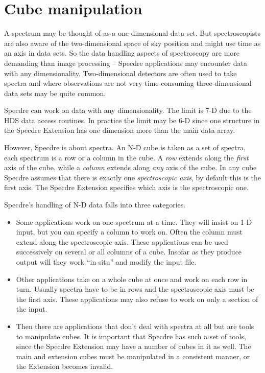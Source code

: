 \goodbreak
\section{Cube manipulation}
\label{cubeman}

A spectrum may be thought of as a one-dimensional data set.  But
spectroscopists are also aware of the two-dimensional space of sky
position and might use time as an axis in data sets.  So the data
handling aspects of spectroscopy are more demanding than image
processing -- Specdre applications may encounter data with any
dimensionality.  Two-dimensional detectors are often used to take
spectra and where observations are not very time-consuming
three-dimensional data sets may be quite common.

Specdre can work on data with any dimensionality.  The limit is 7-D due
to the HDS data access routines.  In practice the limit may be 6-D since
one structure in the Specdre Extension has one dimension more than the
main data array.

However, Specdre is about spectra.  An N-D cube is taken as a set of
spectra, each spectrum is a row or a column in the cube.  A {\it row}
extends along the {\it first} axis of the cube, while a {\it column}
extends along {\it any} axis of the cube.  In any cube Specdre assumes
that there is exactly one {\it spectroscopic axis}, by default this is
the first axis.  The Specdre Extension specifies which axis is the
spectroscopic one.

Specdre's handling of N-D data falls into three categories.

\begin{itemize}
\item Some applications work on one spectrum at a time.  They will
   insist on 1-D input, but you can specify a column to work on.  Often
   the column must extend along the spectroscopic axis.  These
   applications can be used successively on several or all columns of a
   cube.  Insofar as they produce output will they work ``in situ'' and
   modify the input file.

\item Other applications take on a whole cube at once and work on each
   row in turn.  Usually spectra have to be in rows and the
   spectroscopic axis must be the first axis.  These applications may
   also refuse to work on only a section of the input.

\item Then there are applications that don't deal with spectra at all
   but are tools to manipulate cubes.  It is important that Specdre has
   such a set of tools, since the Specdre Extension may have a number of
   cubes in it as well.  The main and extension cubes must be
   manipulated in a consistent manner, or the Extension becomes invalid.

\end{itemize}

